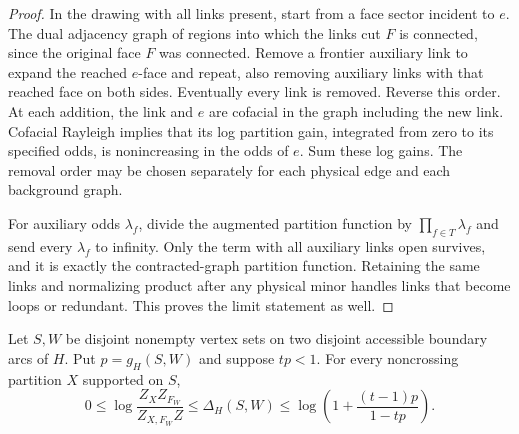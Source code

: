 \begin{proof}
In the drawing with all links present, start from a face sector incident
to $e$.  The dual adjacency graph of regions into which the links cut
$F$ is connected, since the original face $F$ was connected.  Remove
a frontier auxiliary link to expand the reached $e$-face and repeat,
also removing auxiliary links with that reached face on both sides.
Eventually every link is removed.  Reverse this order.  At each
addition, the link and $e$ are cofacial in the graph including the new
link.  Cofacial Rayleigh implies that its log partition gain, integrated
from zero to its specified odds, is nonincreasing in the odds of $e$.
Sum these log gains.  The removal order may be chosen separately for
each physical edge and each background graph.

For auxiliary odds $\lambda_f$, divide the augmented partition function
by $\prod_{f\in T}\lambda_f$ and send every $\lambda_f$ to infinity.
Only the term with all auxiliary links open survives, and it is exactly
the contracted-graph partition function.  Retaining the same links and
normalizing product after any physical minor handles links that become
loops or redundant.  This proves the limit statement as well.
\end{proof}

\begin{lemma}
\label{lem:one-sided-density}
Let $S,W$ be disjoint nonempty vertex sets on two disjoint accessible
boundary arcs of $H$.  Put $p=g_H(S,W)$ and suppose $tp<1$.
For every noncrossing partition $X$ supported on $S$,
\begin{equation}
 0\le \log\frac{Z_XZ_{F_W}}{Z_{X,F_W}Z}
 \le\Delta_H(S,W)
 \le\log\left(1+\frac{(t-1)p}{1-tp}\right).
 \label{rect:one-sided-density}
\end{equation}
\end{lemma}

